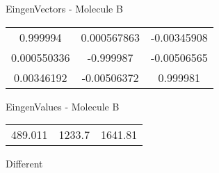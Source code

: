 \begin{multicols}{2}
\begin{center}
\vtab
 EingenVectors - Molecule B     \\
\vtab
\begin{tabular}{|c c c|}
0.999994	 & 	0.000567863	 & 	-0.00345908	 \\
0.000550336	 & 	-0.999987	 & 	-0.00506565	 \\
0.00346192	 & 	-0.00506372	 & 	0.999981
\end{tabular}

\vtab
 EingenValues - Molecule B     \\
\vtab
\begin{tabular}{|c c c|}
489.011	 & 	1233.7	 & 	1641.81	 \\
\end{tabular}

\end{center}
\end{multicols}
\begin{center}
\vtab
\vtab
\textcolor{NavyBlue}{\Large Different}
\end{center}

 \newpage

